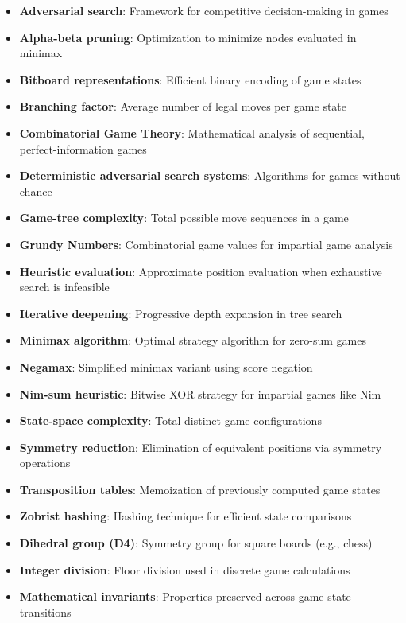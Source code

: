 \documentclass[12pt]{article}
\begin{document}
\begin{itemize}
\item[] \textbf{Adversarial search}: Framework for competitive decision-making in games
\item[] \textbf{Alpha-beta pruning}: Optimization to minimize nodes evaluated in minimax
\item[] \textbf{Bitboard representations}: Efficient binary encoding of game states
\item[] \textbf{Branching factor}: Average number of legal moves per game state
\item[] \textbf{Combinatorial Game Theory}: Mathematical analysis of sequential, perfect-information games
\item[] \textbf{Deterministic adversarial search systems}: Algorithms for games without chance
\item[] \textbf{Game-tree complexity}: Total possible move sequences in a game
\item[] \textbf{Grundy Numbers}: Combinatorial game values for impartial game analysis
\item[] \textbf{Heuristic evaluation}: Approximate position evaluation when exhaustive search is infeasible
\item[] \textbf{Iterative deepening}: Progressive depth expansion in tree search
\item[] \textbf{Minimax algorithm}: Optimal strategy algorithm for zero-sum games
\item[] \textbf{Negamax}: Simplified minimax variant using score negation
\item[] \textbf{Nim-sum heuristic}: Bitwise XOR strategy for impartial games like Nim
\item[] \textbf{State-space complexity}: Total distinct game configurations
\item[] \textbf{Symmetry reduction}: Elimination of equivalent positions via symmetry operations
\item[] \textbf{Transposition tables}: Memoization of previously computed game states
\item[] \textbf{Zobrist hashing}: Hashing technique for efficient state comparisons
\item[] \textbf{Dihedral group (D4)}: Symmetry group for square boards (e.g., chess)
\item[] \textbf{Integer division}: Floor division used in discrete game calculations
\item[] \textbf{Mathematical invariants}: Properties preserved across game state transitions

\end{itemize}
\end{document}
